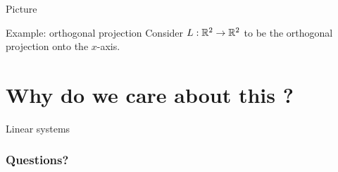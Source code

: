 \documentclass{beamer}
\begin{document}
\begin{frame}{Picture}
\end{frame}


\begin{frame}[t]{Example: orthogonal projection}
	Consider \quad $L: \mathbb{R}^2 \to \mathbb{R}^2$ \quad to be the orthogonal projection onto the $x$-axis.
\end{frame}


\section{Why do we care about this ?}

\begin{frame}[t]{Linear systems}


\end{frame}

\appendix
\backupbegin
\begin{frame}
	\frametitle{Questions?}
\end{frame}
\backupend
\end{document}
